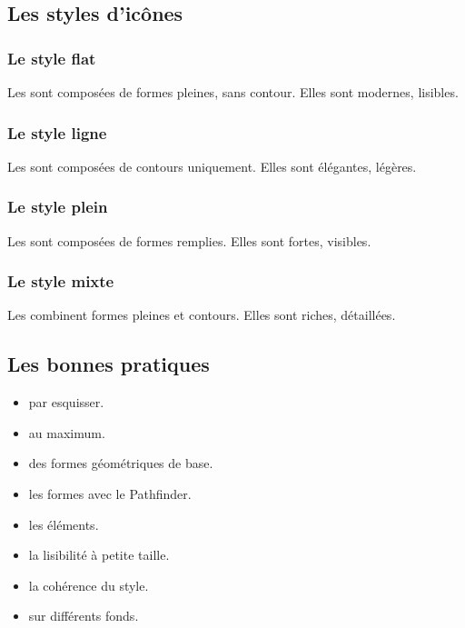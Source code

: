 \subsection{Les styles d'icônes}

\subsubsection{Le style flat}

Les  sont composées de formes pleines, sans contour. Elles sont modernes, lisibles.

\subsubsection{Le style ligne}

Les  sont composées de contours uniquement. Elles sont élégantes, légères.

\subsubsection{Le style plein}

Les  sont composées de formes remplies. Elles sont fortes, visibles.

\subsubsection{Le style mixte}

Les  combinent formes pleines et contours. Elles sont riches, détaillées.

\subsection{Les bonnes pratiques}

\begin{itemize}
    \item {} par esquisser.
    \item {} au maximum.
    \item {} des formes géométriques de base.
    \item {} les formes avec le Pathfinder.
    \item {} les éléments.
    \item {} la lisibilité à petite taille.
    \item {} la cohérence du style.
    \item {} sur différents fonds.
\end{itemize}

